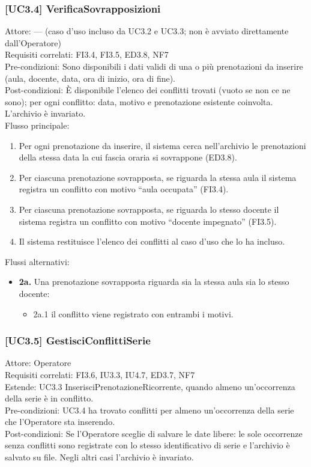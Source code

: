 \subsubsection{[UC3.4] VerificaSovrapposizioni}
\noindent Attore: — (caso d'uso incluso da UC3.2 e UC3.3; non è avviato direttamente dall'Operatore)\\
Requisiti correlati: FI3.4, FI3.5, ED3.8, NF7\\
Pre-condizioni: Sono disponibili i dati validi di una o più prenotazioni da inserire (aula, docente, data, ora di inizio, ora di fine).\\
Post-condizioni: È disponibile l'elenco dei conflitti trovati (vuoto se non ce ne sono); per ogni conflitto: data, motivo e prenotazione esistente coinvolta. L'archivio è invariato.\\

\noindent Flusso principale:
\begin{enumerate}
\item Per ogni prenotazione da inserire, il sistema cerca nell'archivio le prenotazioni della stessa data la cui fascia oraria si sovrappone (ED3.8).
\item Per ciascuna prenotazione sovrapposta, se riguarda la stessa aula il sistema registra un conflitto con motivo ``aula occupata'' (FI3.4).
\item Per ciascuna prenotazione sovrapposta, se riguarda lo stesso docente il sistema registra un conflitto con motivo ``docente impegnato'' (FI3.5).
\item Il sistema restituisce l'elenco dei conflitti al caso d'uso che lo ha incluso.
\end{enumerate}
\noindent Flussi alternativi:
\begin{itemize}
\item \textbf{2a.} Una prenotazione sovrapposta riguarda sia la stessa aula sia lo stesso docente:
\begin{itemize}
\item 2a.1 il conflitto viene registrato con entrambi i motivi.
\end{itemize}
\end{itemize}

\subsubsection{[UC3.5] GestisciConflittiSerie}
\noindent Attore: Operatore\\
Requisiti correlati: FI3.6, IU3.3, IU4.7, ED3.7, NF7\\
Estende: UC3.3 InserisciPrenotazioneRicorrente, quando almeno un'occorrenza della serie è in conflitto.\\
Pre-condizioni: UC3.4 ha trovato conflitti per almeno un'occorrenza della serie che l'Operatore sta inserendo.\\
Post-condizioni: Se l'Operatore sceglie di salvare le date libere: le sole occorrenze senza conflitti sono registrate con lo stesso identificativo di serie e l'archivio è salvato su file. Negli altri casi l'archivio è invariato.\\

